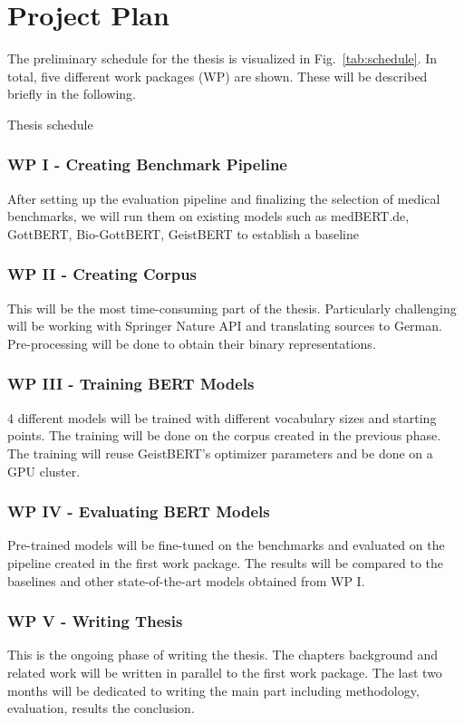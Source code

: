 \chapter*{Project Plan}\label{chapter:schedule}

The preliminary schedule for the thesis is visualized in
Fig.~\ref{tab:schedule}. In total, five different work packages (WP) are shown.
These will be described briefly in the following.

\begin{table}[h]
    \centering
     
    \caption{Thesis schedule}
    \label{tab:schedule}
\end{table}

\subsection*{WP I - Creating Benchmark Pipeline}
After setting up the evaluation pipeline and finalizing the selection of medical
benchmarks, we will run them on existing models such as medBERT.de, GottBERT,
Bio-GottBERT, GeistBERT to establish a baseline

\subsection*{WP II - Creating Corpus}
This will be the most time-consuming part of the thesis. Particularly
challenging will be working with Springer Nature API and translating sources to
German. Pre-processing will be done to obtain their binary representations.

\subsection*{WP III - Training BERT Models}
4 different models will be trained with different vocabulary sizes and starting
points. The training will be done on the corpus created in the previous phase.
The training will reuse GeistBERT's optimizer parameters and be done on a GPU
cluster. 

\subsection*{WP IV - Evaluating BERT Models}
Pre-trained models will be fine-tuned on the benchmarks and evaluated on the
pipeline created in the first work package. The results will be compared to the
baselines and other state-of-the-art models obtained from WP I.

\subsection*{WP V - Writing Thesis}
This is the ongoing phase of writing the thesis. The chapters background and
related work  will be written in parallel to the first work package. The last
two months will be dedicated to writing the main part including methodology,
evaluation, results the conclusion.

